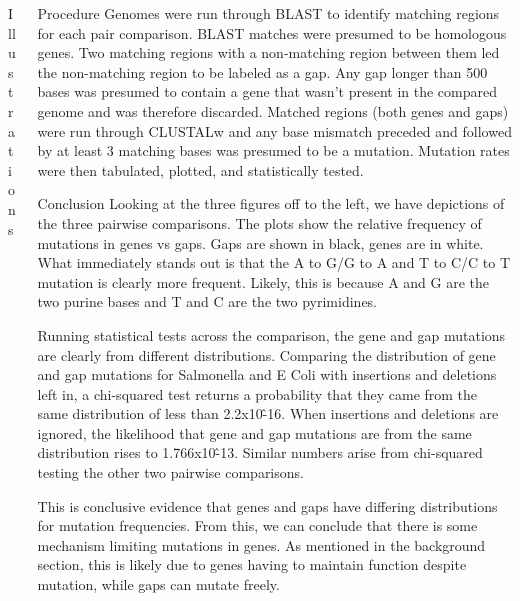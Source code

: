 \documentclass[final]{beamer}
\begin{document}
\begin{frame}{}
\begin{columns}[t]
\begin{column}{.32 \linewidth}
\begin{block}{\large Illustrations}
\end{block}


\end{column}




\begin{column}{.32 \linewidth}

\begin{block}{Procedure}
Genomes were run through BLAST to identify matching regions for each pair comparison. BLAST matches were presumed to be homologous genes. Two matching regions with a non-matching region between them led the non-matching region to be labeled as a gap. Any gap longer than 500 bases was presumed to contain a gene that wasn't present in the compared genome and was therefore discarded.
\newline
Matched regions (both genes and gaps) were run through CLUSTALw and any base mismatch preceded and followed by at least 3 matching bases was presumed to be a mutation. Mutation rates were then tabulated, plotted, and statistically tested.
\end{block}
\begin{block}{\large Conclusion}
Looking at the three figures off to the left, we have depictions of the three pairwise comparisons. The plots show the relative frequency of mutations in genes vs gaps. Gaps are shown in black, genes are in white. What immediately stands out is that the A to G/G to A and T to C/C to T mutation is clearly more frequent. Likely, this is because A and G are the two purine bases and T and C are the two pyrimidines.

Running statistical tests across the comparison, the gene and gap mutations are clearly from different distributions. Comparing the distribution of gene and gap mutations for Salmonella and E Coli with insertions and deletions left in, a chi-squared test returns a probability that they came from the same distribution of less than 2.2x10\^-16. When insertions and deletions are ignored, the likelihood that gene and gap mutations are from the same distribution rises to 1.766x10\^-13. Similar numbers arise from chi-squared testing the other two pairwise comparisons. 

This is conclusive evidence that genes and gaps have differing distributions for mutation frequencies. From this, we can conclude that there is some mechanism limiting mutations in genes. As mentioned in the background section, this is likely due to genes having to maintain function despite mutation, while gaps can mutate freely.




\end{block}
\end{column}
\end{columns}
\end{frame}
\end{document}
